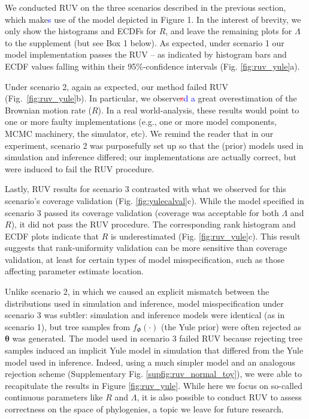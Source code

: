 \documentclass[oneside]{article}
\begin{document}
We conducted RUV on the three scenarios described in the previous section, which make\textcolor{blue}{s} use of the model depicted in Figure 1.
In the interest of brevity, we only show the histograms and ECDFs for $R$, and leave the remaining plots for $\Lambda$ to the supplement (but see Box 1 below).
As expected, under scenario 1 our model implementation passes the RUV -- as indicated by histogram bars and ECDF values falling within their 95\%-confidence intervals (Fig. \ref{fig:ruv_yule}a).

Under scenario 2, again as expected, our method failed RUV (Fig.~\ref{fig:ruv_yule}b).
In particular, we observe\textcolor{red}{\st{s}}\textcolor{blue}{d a} great overestimation of the Brownian motion rate ($R$).
In a real world-analysis, these results would point to one or more faulty implementations (e.g., one or more model components, MCMC machinery, the simulator, etc).
We remind the reader that in our experiment, scenario 2 was purposefully set up so that the (prior) models used in simulation and inference differed; our implementations are actually correct, but were induced to fail the RUV procedure.

Lastly, RUV results for scenario 3 contrasted with what we observed for this scenario's coverage validation (Fig. \ref{fig:yulecalval}c).
While the model specified in scenario 3 passed its coverage validation (coverage was acceptable for both $\Lambda$ and $R$), it did not pass the RUV procedure.
The corresponding rank histogram and ECDF plots indicate that $R$ is underestimated (Fig. \ref{fig:ruv_yule}c).
This result suggests that rank-uniformity validation can be more sensitive than coverage validation, at least for certain types of model misspecification, such as those affecting parameter estimate location.

Unlike scenario 2, in which we caused an explicit mismatch between the distributions used in simulation and inference, model misspecification under scenario 3 was subtler: simulation and inference models were identical (as in scenario 1), but tree samples from $f_\Phi(\cdot)$ (the Yule prior) were often rejected as $\boldsymbol{\theta}$ was generated.
The model used in scenario 3 failed RUV because rejecting tree samples induced an implicit Yule model in simulation that differed from the Yule model used in inference. 
Indeed, using a much simpler model and an analogous rejection scheme (Supplementary Fig. \ref{supfig:ruv_normal_toy}), we were able to recapitulate the results in Figure \ref{fig:ruv_yule}.
While here we focus on so-called continuous parameters like $R$ and $\Lambda$, it is also possible to conduct RUV to assess correctness on the space of phylogenies, a topic we leave for future research.
\end{document}
